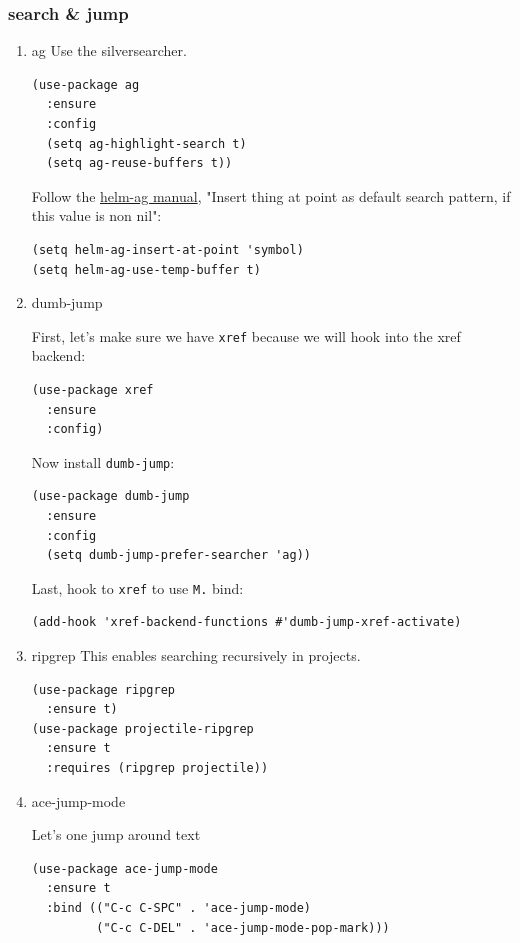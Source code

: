 \documentclass[11pt]{article}
\begin{document}
\subsubsection{search \& jump}
\label{sec:orgc21af8c}
\begin{enumerate}
\item ag
\label{sec:org314b1b1}
Use the silversearcher.
\begin{verbatim}
(use-package ag
  :ensure
  :config
  (setq ag-highlight-search t)
  (setq ag-reuse-buffers t))
\end{verbatim}

Follow the \href{https://github.com/emacsorphanage/helm-ag}{helm-ag manual}, "Insert thing at point as default search
pattern, if this value is non nil":

\begin{verbatim}
(setq helm-ag-insert-at-point 'symbol)
(setq helm-ag-use-temp-buffer t)
\end{verbatim}
\item dumb-jump
\label{sec:org5159961}

First, let's make sure we have \texttt{xref} because we will hook into the
xref backend:

\begin{verbatim}
(use-package xref
  :ensure
  :config)
\end{verbatim}

Now install \texttt{dumb-jump}:

\begin{verbatim}
(use-package dumb-jump
  :ensure
  :config
  (setq dumb-jump-prefer-searcher 'ag))
\end{verbatim}

Last, hook to \texttt{xref} to use \texttt{M.} bind:

\begin{verbatim}
(add-hook 'xref-backend-functions #'dumb-jump-xref-activate)
\end{verbatim}
\item ripgrep
\label{sec:org5fd2db7}
This enables searching recursively in projects.

\begin{verbatim}
(use-package ripgrep
  :ensure t)
(use-package projectile-ripgrep
  :ensure t
  :requires (ripgrep projectile))
\end{verbatim}

\item ace-jump-mode
\label{sec:orgaeae224}

Let's one jump around text

\begin{verbatim}
(use-package ace-jump-mode
  :ensure t
  :bind (("C-c C-SPC" . 'ace-jump-mode)
         ("C-c C-DEL" . 'ace-jump-mode-pop-mark)))
\end{verbatim}
\end{enumerate}
\end{document}
